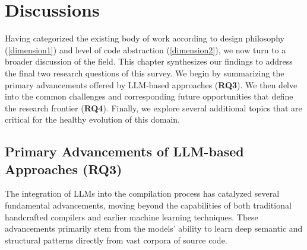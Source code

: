 \documentclass[pdflatex,sn-mathphys-ay,twocolumn, a4paper]{sn-jnl}%
\theoremstyle{thmstyleone}%
\theoremstyle{thmstyletwo}%
\theoremstyle{thmstylethree}%
\begin{document}
\section{Discussions}\label{sec:discussion}

Having categorized the existing body of work according to design philosophy (\autoref{dimension1}) and level of code abstraction (\autoref{dimension2}), we now turn to a broader discussion of the field. This chapter synthesizes our findings to address the final two research questions of this survey. We begin by summarizing the primary advancements offered by LLM-based approaches (\textbf{RQ3}). We then delve into the common challenges and corresponding future opportunities that define the research frontier (\textbf{RQ4}). Finally, we explore several additional topics that are critical for the healthy evolution of this domain.

\subsection{Primary Advancements of LLM-based Approaches (\textbf{RQ3})}

The integration of LLMs into the compilation process has catalyzed several fundamental advancements, moving beyond the capabilities of both traditional handcrafted compilers and earlier machine learning techniques. These advancements primarily stem from the models' ability to learn deep semantic and structural patterns directly from vast corpora of source code.
\end{document}
